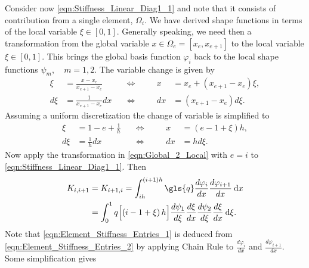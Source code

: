 Consider now \cref{eqn:Stiffness_Linear_Diag1_1} and note that it consists of contribution from a single element,
$\Omega_{i}$. We have derived shape functions in terms of the local variable $\xi \in \left[ 0, 1 \right]$. Generally speaking,
we need then a transformation from the global variable $x \in \Omega_{e} = \left[ x_e, x_{e + 1} \right]$ to the local variable
$\xi \in \left[ 0, 1 \right]$. This brings the global basis function $\varphi_i$ back to the local shape functions
$\psi_m, \quad m = 1, 2$. The variable change is given by
\begin{equation}	\label{eqn:Global_2_Local_1}
	\begin{alignedat}{3}
		\xi	  &= \frac{x-x_{e}}{x_{e+1}-x_{e}}	\quad& \Leftrightarrow \quad&& x  &= x_{e}+\left(x_{e+1}-x_{e} \right) \xi, \\
		d \xi &= \frac{1}{x_{e + 1} - x_{e}} dx	\quad& \Leftrightarrow \quad&& dx &= \left(x_{e+1}-x_{e} \right) d \xi.
	\end{alignedat}
\end{equation}
Assuming a uniform discretization the change of variable is simplified to
\begin{equation}	\label{eqn:Global_2_Local}
	\begin{alignedat}{3}
		\xi		&= 1 - e + \frac{1}{h} \quad& \Leftrightarrow \quad&&	x  &= \left( e - 1 + \xi \right) h,	\\
		d \xi	&= \frac{1}{h} dx \quad& \Leftrightarrow \quad&&		dx &= hd \xi.
	\end{alignedat}
\end{equation}
Now apply the transformation in \cref{eqn:Global_2_Local} with $e = i$ to \cref{eqn:Stiffness_Linear_Diag1_1}. Then
\begin{subequations}
	\begin{align}
		K_{i, i + 1} &= K_{i + 1, i} = \int_{ ih }^{ \left( i + 1 \right) h } \gls{q} \frac{ d \varphi_i }{ dx }
			\frac{ d \varphi_{i + 1} }{ dx } \dd x	\label{eqn:Element_Stiffness_Entries_1} \\
		&= \int_{ 0 }^{ 1 } q \Bigl[ \left( i - 1 + \xi \right) h \Bigr] \frac{ d \psi_1 }{ d \xi } \frac{d \xi}{ dx }
			\frac{ d \psi_2 }{ d \xi } \frac{ d \xi }{dx} \dd \xi.	\label{eqn:Element_Stiffness_Entries_2} 
	\end{align}
\end{subequations}
Note that \cref{eqn:Element_Stiffness_Entries_1} is deduced from \cref{eqn:Element_Stiffness_Entries_2} by applying Chain Rule to 
$\frac{ d \varphi_i }{ dx }$ and $\frac{ d \varphi_{i + 1} }{ dx }$. Some simplification gives
